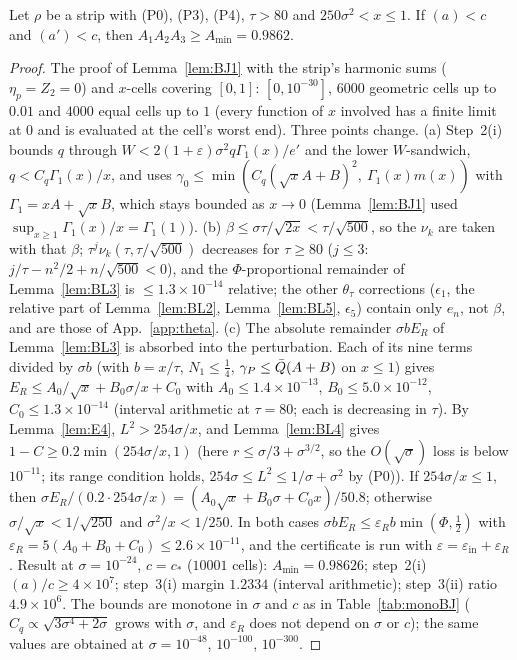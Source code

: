 \begin{lemma} 
\label{lem:E5}
Let $\rho$ be a strip with (P0), (P3), (P4), $\tau>80$ and $250\sigma^2<x\le1$. If $(a)<c$ and $(a')<c$, then $A_1A_2A_3\ge A_{\min}=0.9862$.
\end{lemma}
\begin{proof}
The proof of Lemma~\ref{lem:BJ1} with the strip's harmonic sums ($\eta_p=Z_2=0$) and $x$-cells covering $[0,1]$: $[0,10^{-30}]$, $6000$ geometric cells up
to $0.01$ and $4000$ equal cells up to $1$ (every function of $x$ involved has a finite limit at $0$ and is evaluated at the cell's worst end). Three
points change.
(a) Step~2(i) bounds $q$ through $W<2(1+\varepsilon)\sigma^2q\Gamma_1(x)/e'$ and the lower $W$-sandwich, $q<C_q\Gamma_1(x)/x$, and uses
$\gamma_0\le\min(C_q(\sqrt xA+B)^2,\ \Gamma_1(x)m(x))$ with $\Gamma_1=xA+\sqrt xB$, which stays bounded as $x\to0$ (Lemma~\ref{lem:BJ1} used
$\sup_{x\ge1}\Gamma_1(x)/x=\Gamma_1(1)$).
(b) $\beta\le\sigma\tau/\sqrt{2x}<\tau/\sqrt{500}$, so the $\nu_k$ are taken with that $\beta$; $\tau^j\nu_k(\tau,\tau/\sqrt{500})$ decreases for $\tau\ge80$ ($j\le3$:
$j/\tau-n^2/2+n/\sqrt{500}<0$), and the $\Phi$-proportional remainder of Lemma~\ref{lem:BL3} is $\le1.3\times10^{-14}$ relative; the other $\theta_\tau$ corrections ($\epsilon_1$, the
relative part of Lemma~\ref{lem:BL2}, Lemma~\ref{lem:BL5}, $\epsilon_5$) contain only $e_n$, not $\beta$, and are those of App.~\ref{app:theta}.
(c) The absolute remainder $\sigma bE_R$ of Lemma~\ref{lem:BL3} is absorbed into the perturbation. Each of its nine terms divided by $\sigma b$ (with
$b=x/\tau$, $N_1\le\frac14$, $\gamma_P\le\bar Q(A+B)$ on $x\le1$) gives $E_R\le A_0/\sqrt x+B_0\sigma/x+C_0$ with $A_0\le1.4\times10^{-13}$,
$B_0\le5.0\times10^{-12}$, $C_0\le1.3\times10^{-14}$ (interval arithmetic at $\tau=80$; each is decreasing in $\tau$). By Lemma~\ref{lem:E4},
$L^2>254\sigma/x$, and Lemma~\ref{lem:BL4} gives $1-C\ge0.2\min(254\sigma/x,1)$ (here $r\le\sigma/3+\sigma^{3/2}$, so the $O(\sqrt\sigma)$ loss is
below $10^{-11}$; its range condition holds, $254\sigma\le L^2\le1/\sigma+\sigma^2$ by (P0)). If $254\sigma/x\le1$, then $\sigma E_R/(0.2\cdot254\sigma/x)=(A_0\sqrt x+B_0\sigma+C_0x)/50.8$; otherwise $\sigma/\sqrt x<1/\sqrt{250}$ and
$\sigma^2/x<1/250$. In both cases $\sigma bE_R\le\varepsilon_Rb\min(\Phi,\frac12)$ with $\varepsilon_R=5(A_0+B_0+C_0)\le2.6\times10^{-11}$, and the
certificate is run with $\varepsilon=\varepsilon_{\mathrm{in}}+\varepsilon_R$.
Result at $\sigma=10^{-24}$, $c=c_*$ ($10001$ cells): $A_{\min}=0.98626$; step~2(i) $(a)/c\ge4\times10^{7}$; step~3(i) margin $1.2334$ (interval arithmetic);
step~3(ii) ratio $4.9\times10^{6}$. The bounds are monotone in $\sigma$ and $c$ as in Table~\ref{tab:monoBJ} ($C_q\propto\sqrt{3\sigma^4+2\sigma}$ grows with $\sigma$, and $\varepsilon_R$ does not
depend on $\sigma$ or $c$); the same values are obtained at
$\sigma=10^{-48}$, $10^{-100}$, $10^{-300}$.
\end{proof}


